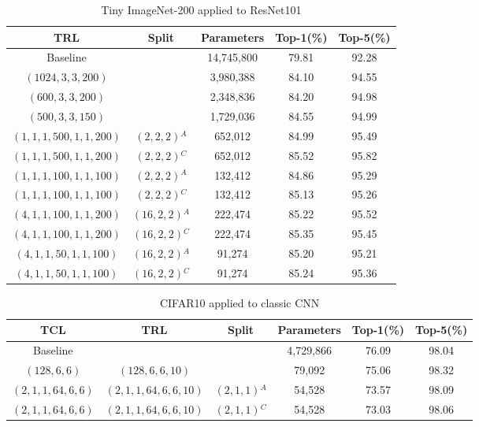\documentclass{article}
\begin{document}
	\begin{table}
	\caption{Tiny ImageNet-200 applied to ResNet101}
	\label{atab-6}
	\centering
	\begin{tabular}{c c c c c}
		\toprule
		\textbf{TRL} & \textbf{Split} & \textbf{Parameters} & \textbf{Top-1(\%)} & \textbf{Top-5(\%)} \\
		\midrule
		Baseline & & 14,745,800 & 79.81 & 92.28 \\
		$(1024,3,3,200)$ & & 3,980,388 & 84.10 & 94.55 \\
		$(600,3,3,200)$ & & 2,348,836 & 84.20 & 94.98 \\
		$(500,3,3,150)$ & & 1,729,036 & 84.55 & 94.99 \\
		$(1,1,1,500,1,1,200)$ & $(2,2,2)$$^A$ & 652,012 & 84.99 & 95.49 \\
		$(1,1,1,500,1,1,200)$ & $(2,2,2)$$^C$ & 652,012 & 85.52 & 95.82 \\
		$(1,1,1,100,1,1,100)$ & $(2,2,2)$$^A$ & 132,412 & 84.86 & 95.29 \\
		$(1,1,1,100,1,1,100)$ & $(2,2,2)$$^C$ & 132,412 & 85.13 & 95.26 \\
		$(4,1,1,100,1,1,200)$ & $(16,2,2)$$^A$ & 222,474 & 85.22 & 95.52 \\
		$(4,1,1,100,1,1,200)$ & $(16,2,2)$$^C$ & 222,474 & 85.35 & 95.45 \\
		$(4,1,1,50,1,1,100)$ & $(16,2,2)$$^A$ & 91,274 & 85.20 & 95.21 \\
		$(4,1,1,50,1,1,100)$ & $(16,2,2)$$^C$ & 91,274 & 85.24 & 95.36 \\
		\hline
	\end{tabular}
\end{table}

\begin{table}
	\caption{CIFAR10 applied to classic CNN}
	\label{atab-7}
	\centering
	\begin{tabular}{c c c c c c}
		\toprule
		\textbf{TCL} & \textbf{TRL} & \textbf{Split} & \textbf{Parameters} & \textbf{Top-1(\%)} & \textbf{Top-5(\%)} \\
		\midrule
		Baseline& & & 4,729,866 & 76.09 & 98.04 \\
		$(128,6,6)$ & $(128,6,6,10)$ & & 79,092 & 75.06 & 98.32 \\
		$(2,1,1,64,6,6)$ & $(2,1,1,64,6,6,10)$ & $(2,1,1)$$^A$ & 54,528 & 73.57 & 98.09 \\
		$(2,1,1,64,6,6)$ & $(2,1,1,64,6,6,10)$ & $(2,1,1)$$^C$ & 54,528 & 73.03 & 98.06 \\
		\hline
	\end{tabular}
\end{table}
\end{document}
